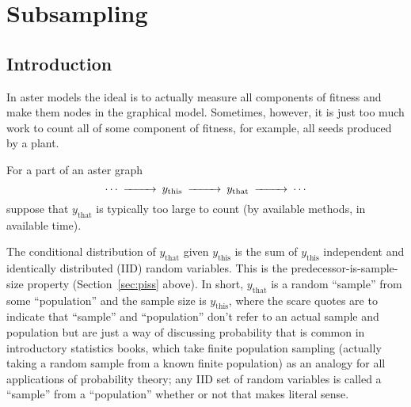 
\chapter{Subsampling} \label{chap:subsampling}

\section{Introduction}

In aster models the ideal is to actually measure
all components of fitness and make them nodes in the graphical model.
Sometimes, however, it is just too much work to count all of some component
of fitness, for example, all seeds produced by a plant.

For a part of an aster graph
$$
\begin{CD}
   \cdots @>>> y_\text{this} @>>> y_\text{that} @>>> \cdots
\end{CD}
$$
suppose that $y_\text{that}$ is typically too large to count
(by available methods, in available time).

The conditional distribution of $y_\text{that}$ given $y_\text{this}$ is
the sum of $y_\text{this}$
independent and identically distributed (IID) random variables.
This is the predecessor-is-sample-size property
(Section~\ref{sec:piss} above).
In short, $y_\text{that}$ is a random ``sample''
from some ``population'' and the sample size is $y_\text{this}$, where the scare
quotes are to indicate that ``sample'' and ``population'' don't refer
to an actual sample and population but are just a way of discussing
probability that is common in introductory statistics books, which
take finite population sampling (actually taking a random sample from
a known finite population) as an analogy for all applications of probability
theory; any IID set of random variables is called a ``sample'' from
a ``population'' whether or not that makes literal sense.

